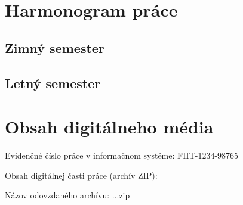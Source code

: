\documentclass[12pt, a4paper, twoside, openright, slovak]{book}
\newcommand{\RegNo}[0] {FIIT-1234-98765}
\begin{document}


\thispagestyle{empty}
\chapter{Harmonogram práce}
\renewcommand*{\thepage}{B-\arabic{page}}
\section{Zimný semester}
\section{Letný semester}

\thispagestyle{empty}

\chapter{Obsah digitálneho média}
\renewcommand*{\thepage}{C-\arabic{page}}
\par Evidenčné číslo práce v informačnom systéme: \RegNo
\par Obsah digitálnej časti práce (archív ZIP):
\par Názov odovzdaného archívu: ...zip
\end{document}
